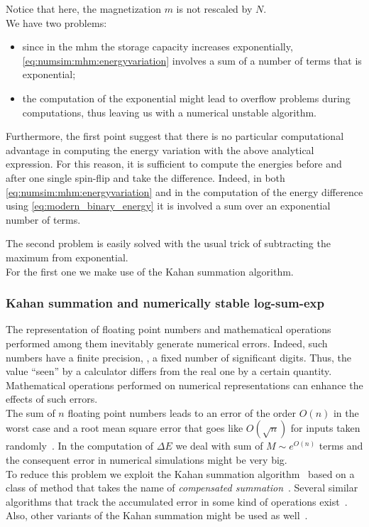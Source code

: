 \documentclass[\rootdir/main.tex]{subfiles}
\begin{document}
Notice that here, the magnetization $m$ is not rescaled by $N$.\\
We have two problems:
\begin{itemize}
    \item since in the \acrlong{mhm} the storage capacity increases exponentially, \cref{eq:numsim:mhm:energyvariation} involves a sum of a number of terms that is exponential;
    \item the computation of the exponential might lead to overflow problems during computations, thus leaving us with a numerical unstable algorithm.
\end{itemize}
Furthermore, the first point suggest that there is no particular computational advantage in computing the energy variation with the above analytical expression. For this reason, it is sufficient to compute the energies before and after one single spin-flip and take the difference. Indeed, in both \cref{eq:numsim:mhm:energyvariation} and in the computation of the energy difference using \cref{eq:modern_binary_energy} it is involved a sum over an exponential number of terms.

The second problem is easily solved with the usual trick of subtracting the maximum from exponential.\\
For the first one we make use of the Kahan summation algorithm.

\subsubsection{Kahan summation and numerically stable log-sum-exp}
The representation of floating point numbers and mathematical operations performed among them inevitably generate numerical errors. Indeed, such numbers have a finite precision, \ie, a fixed number of significant digits. Thus, the value ``seen'' by a calculator differs from the real one by a certain quantity. Mathematical operations performed on numerical representations can enhance the effects of such errors.\\
The sum of $n$ floating point numbers leads to an error of the order $O(n)$ in the worst case and a root mean square error that goes like $O\left(\sqrt{n}\right)$ for inputs taken randomly~\cite{accuracy_floating_point}.
In the computation of $\Delta E$ we deal with sum of $M \sim e^{O(n)}$ terms and the consequent error in numerical simulations might be very big.\\
To reduce this problem we exploit the Kahan summation algorithm~\cite{kahan_truncation} based on a class of method that takes the name of \emph{compensated summation}~\cite{accuracy_floating_point}. Several similar algorithms that track the accumulated error in some kind of operations exist~\cite{deltasigma, bresenham}. Also, other variants of the Kahan summation might be used as well~\cite{kahan-babuska}.
\end{document}
